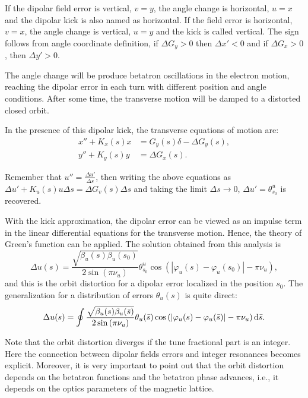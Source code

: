 If the dipolar field error is vertical, $v=y$, the angle change is horizontal, $u=x$ and the dipolar kick is also named as horizontal. If the field error is horizontal, $v=x$, the angle change is vertical, $u=y$ and the kick is called vertical. The sign follows from angle coordinate definition, if $\Delta G_y > 0$ then $\Delta x' < 0$ and if $\Delta G_x > 0$, then $\Delta y' > 0$.

The angle change will be produce betatron oscillations in the electron motion, reaching the dipolar error in each turn with different position and angle conditions. After some time, the transverse motion will be damped to a distorted closed orbit. 

In the presence of this dipolar kick, the transverse equations of motion  are:
\begin{align}
    x'' + K_x(s)x &= G_y(s) \delta - \Delta G_y(s), \\
    y'' + K_y(s)y &= \Delta G_x(s).
\end{align}

Remember that $u'' = \frac{\Delta u'}{\Delta s}$, then writing the above equations as $\Delta u' + K_u(s) u \Delta s = \Delta G_v(s) \Delta s$ and taking the limit $\Delta s \rightarrow 0$, $\Delta u' = \theta^{u}_{s_0}$ is recovered. 

With the kick approximation, the dipolar error can be viewed as an impulse term in the linear differential equations for the transverse motion. Hence, the theory of Green's function can be applied. The solution obtained from this analysis is
\begin{equation}
    \Delta u(s) = \dfrac{\sqrt{\beta_{u}(s)\beta_{u}(s_0)}}{2\sin\left(\pi\nu_{u}\right)} \theta_{s_0}^{u} \cos\left( |\varphi_{u}(s) - \varphi_{u}(s_0)| - \pi\nu_{u} \right),
\end{equation}
and this is the orbit distortion for a dipolar error localized in the position $s_0$. The generalization for a distribution of errors $\theta_u(s)$ is quite direct:
\begin{equation}
    \Delta u(s) = \oint \dfrac{\sqrt{\beta_{u}(s)\beta_{u}(\bar{s})}}{2\sin\left(\pi\nu_{u}\right)} \theta_{u}(\bar{s}) \cos\left( |\varphi_{u}(s) - \varphi_{u}(\bar{s})| - \pi\nu_{u} \right) \mathrm{d} \bar{s}.
    \label{eq:orbit_distortion}
\end{equation}

Note that the orbit distortion diverges if the tune fractional part is an integer. Here the connection between dipolar fields errors and integer resonances becomes explicit. Moreover, it is very important to point out that the orbit distortion depends on the betatron functions and the betatron phase advances, i.e., it depends on the optics parameters of the magnetic lattice.
